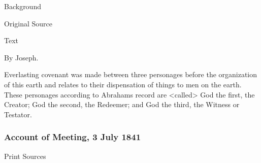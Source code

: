 				\begin{description}
					\item[Background]
				\end{description}
				
				
				\begin{description}
					\item[Original Source]
				\end{description}
				
				
				\begin{description}
					\item[Text]
				\end{description}
				
					\begin{tightcenter}
						By Joseph.
					\end{tightcenter}
					
					Everlasting covenant was made between three personages before the organization of this earth and relates to their dispensation of things to men on the earth. These personages according to Abrahams record are <called> God the first, the Creator; God the second, the Redeemer; and God the third, the Witness or Testator.
					
		\subsubsection{Account of Meeting, 3 July 1841}
			\label{EMS-1841-JS-3-JUL-1841}
				
			\begin{description}
				\item[Print Sources]
			\end{description}

